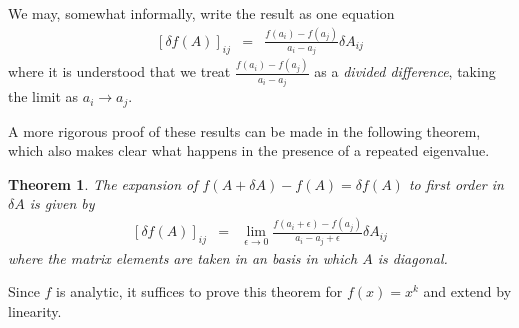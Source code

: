 \documentclass{article}
\newcommand{\beas}{\begin{eqnarray*}}
\newcommand{\enas}{\end{eqnarray*}}
\newcommand{\bea}{\begin{eqnarray}} \newcommand{\ena}{\end{eqnarray}}
\newtheorem{theorem}{Theorem}[section]
\begin{document}
We may, somewhat informally, write the result as one equation
\bea
\label{jac_eq}
 \left[\delta f(A)\right]_{ij} &=& \frac{f(a_i) - f(a_j)}{a_i - a_j} \delta A_{ij}
\ena
where it is understood that we treat
$\frac{f(a_i) - f(a_j)}{a_i - a_j}$
as a {\em divided difference}, taking the limit as $a_i \rightarrow a_j$.

A more rigorous proof of these results can be made in the following theorem,
which also makes clear what happens in the presence of a repeated eigenvalue.
\begin{theorem}
The expansion of $f(A + \delta A) - f(A) = \delta f(A)$
 to first order in $\delta A$ is given by
\beas
\left[ \delta f(A) \right]_{ij} 
&=& \lim_{\epsilon\rightarrow 0}
     \frac{f(a_i+\epsilon) - f(a_j)}{a_i - a_j+\epsilon}
     \delta A_{ij} %
\enas
where the matrix elements are taken in an basis in which
$A$ is diagonal.
\end{theorem}
\proof
Since $f$ is analytic, it suffices to prove this theorem for
$f(x) = x^k$ and extend by linearity.
\end{document}
